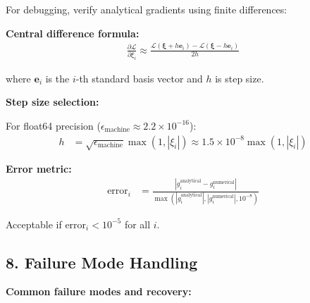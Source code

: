 \documentclass[11pt,a4paper]{article}
\begin{document}
For debugging, verify analytical gradients using finite differences:

\textbf{Central difference formula:}
\begin{align}
\frac{\partial \mathcal{L}}{\partial \xi_i} \approx \frac{\mathcal{L}(\bm{\xi} + h \bm{e}_i) - \mathcal{L}(\bm{\xi} - h \bm{e}_i)}{2h}
\end{align}

where $\bm{e}_i$ is the $i$-th standard basis vector and $h$ is step size.

\textbf{Step size selection:}

For float64 precision ($\epsilon_{\text{machine}} \approx 2.2 \times 10^{-16}$):
\begin{align}
h &= \sqrt{\epsilon_{\text{machine}}} \max(1, |\xi_i|) \approx 1.5 \times 10^{-8} \max(1, |\xi_i|)
\end{align}

\textbf{Error metric:}
\begin{align}
\text{error}_i &= \frac{|g_i^{\text{analytical}} - g_i^{\text{numerical}}|}{\max(|g_i^{\text{analytical}}|, |g_i^{\text{numerical}}|, 10^{-8})}
\end{align}

Acceptable if $\text{error}_i < 10^{-5}$ for all $i$.

\subsection*{8. Failure Mode Handling}

\textbf{Common failure modes and recovery:}
\end{document}
